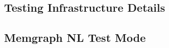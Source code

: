 \documentclass[a4paper,twoside]{sapthesis}
\begin{document}
\subsection{Testing Infrastructure Details}
%
%
%
%

\subsection{Memgraph NL Test Mode}
\end{document}
